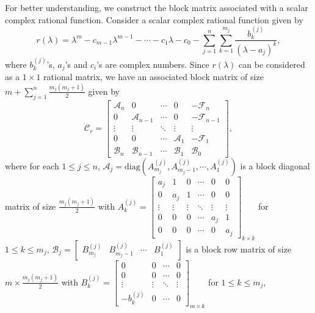 \documentclass[12pt, reqno]{amsart}
\theoremstyle{definition}
\theoremstyle{remark}
\numberwithin{equation}{section}
\begin{document}
\medskip
For better understanding, we construct the block matrix associated with a 
scalar complex rational function. Consider a scalar complex rational function 
given by
\begin{equation}\label{Eqn-scalar rational function}
r(\lambda) = \lambda^m- c_{m-1}\lambda^{m-1} - \cdots -c_1 \lambda - c_0 -  
\displaystyle \sum_{j=1}^{n} \sum_{k=1}^{m_j} \frac{b_k^{(j)}}{(\lambda-a_j)^k}, 
\end{equation}
where $b_k^{(j)}$'s, $a_j$'s and $c_i$'s are complex numbers.
Since $r(\lambda)$ can be considered as a $1\times 1$ rational matrix, 
we have an associated block matrix of size $m + \displaystyle 
\sum_{j=1}^{n}\frac{m_j(m_j+1)}{2}$ given by 
\begin{equation}\label{Eqn-block matrix for scalar rational fcn}
\mathcal{C}_r= \begin{bmatrix}
\mathcal{A}_n & 0 & \cdots & 0 & -\mathcal{F}_n \\
0 & \mathcal{A}_{n-1} & \cdots & 0 & -\mathcal{F}_{n-1} \\
\vdots & \vdots & \ddots & \vdots & \vdots \\
0 & 0 & \cdots & \mathcal{A}_1 & -\mathcal{F}_1 \\
\mathcal{B}_n & \mathcal{B}_{n-1} & \cdots & \mathcal{B}_1 & \mathcal{B}_0
\end{bmatrix}, 
\end{equation}
where for each $1 \leq j \leq n$,   
$\mathcal{A}_j = \text{diag}(A_{m_j}^{(j)},A_{m_j-1}^{(j)},\cdots,A_1^{(j)})$ is a 
block diagonal matrix of size $\displaystyle \frac{m_j(m_j+1)}{2}$ with $A_k^{(j)} 
=\begin{bmatrix}
a_j & 1 & 0 & \cdots & 0 & 0 \\
0 & a_j & 1 & \cdots & 0 & 0 \\
\vdots & \vdots & \vdots & \ddots & \vdots & \vdots \\
0 & 0 & 0 & \cdots & a_j & 1 \\
0 & 0 & 0 & \cdots & 0 & a_j
\end{bmatrix}_{k \times k}$ for $1\leq k \leq m_j$,
$\mathcal{B}_j = \begin{bmatrix}
B_{m_j}^{(j)} & B_{m_j-1}^{(j)} & \cdots & B_1^{(j)}
\end{bmatrix}$ is a block row matrix of size $\displaystyle m \times 
\frac{m_j(m_j+1)}{2}$ with $B_k^{(j)} = \begin{bmatrix}
0 & 0 & \cdots & 0 \\
0 & 0 & \cdots & 0 \\
\vdots & \vdots & \ddots & \vdots \\
-b_{k}^{(j)} & 0 & \cdots & 0
\end{bmatrix}_{m \times k}$ for $ 1 \leq k \leq m_j $, 
\end{document}
